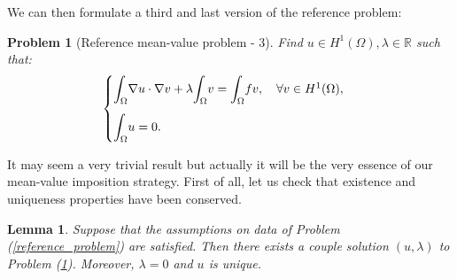 \documentclass[a4paper,11pt]{article}
\newtheorem{problem}{Problem}
\newtheorem{lemma}{Lemma}
\begin{document}
\noindent We can then formulate a third and last version of the reference problem:
\begin{problem}[Reference mean-value problem - 3]\label{reference_problem_3} Find $ u \in H^1(\Omega), \lambda \in \mathbb{R}$ such that:
	\begin{equation*}
	\begin{cases}
	\mathlarger{\int}_{\Omega}\nabla u \cdot \nabla v + \lambda \mathlarger{\int}_\Omega v = \mathlarger{\int}_{\Omega} fv, \quad \forall v \in H^1(\Omega), \\[3ex]
	\mathlarger{\int}_{\Omega}u= 0.
	\end{cases}
	\end{equation*}
\end{problem}

\noindent It may seem a very trivial result but actually it will be the very essence of our mean-value imposition strategy. First of all, let us check that existence and uniqueness properties have been conserved. \\
\begin{lemma} \label{lemma_lagrange}
	Suppose that the assumptions on data of Problem (\ref{reference_problem}) are satisfied. Then there exists a couple solution $(u,\lambda)$ to Problem (\ref{reference_problem_3}). Moreover, $\lambda=0$ and $u$ is unique. 
\end{lemma}
\end{document}
